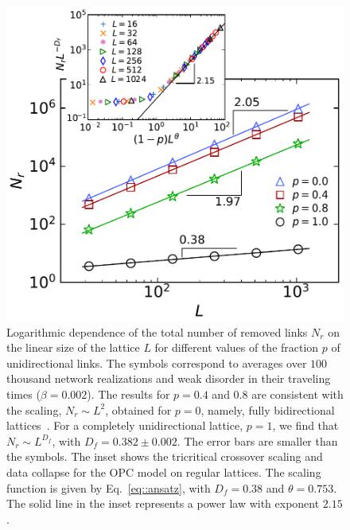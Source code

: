 \documentclass[aps,prl,twocolumn,showpacs,
superscriptaddress,floatfix, 10pt]{revtex4-1}
\begin{document}
\begin{figure}[ht]
	\centering
	\includegraphics[width=0.85\columnwidth]{fig2} 
\caption{Logarithmic dependence of the total number of removed links $N_r$ on
	the linear size of the lattice $L$ for different values of the fraction $p$ of
	unidirectional links. The symbols correspond to averages over $100$ thousand
	network realizations and weak disorder in their traveling times
	($\beta=0.002$). The results for $p=0.4$ and $0.8$ are consistent with the
	scaling, $N_r\sim L^2$, obtained for $p=0$, namely, fully bidirectional
	lattices~\cite{Andrade2009}. For a completely unidirectional lattice, $p=1$, we
	find that $N_r\sim L^{D_f}$, with $D_f=0.382\pm 0.002$. The error bars are
	smaller than the symbols. The inset shows the tricritical crossover scaling and
	data collapse for the OPC model on regular lattices. The scaling function is
	given by Eq.~\eqref{eq::ansatz}, with $D_f=0.38$ and $\theta=0.753$. The solid
	line in the inset represents a power law with exponent $2.15$.
	~\label{fig::number.removed.links}}
\end{figure}
\end{document}
